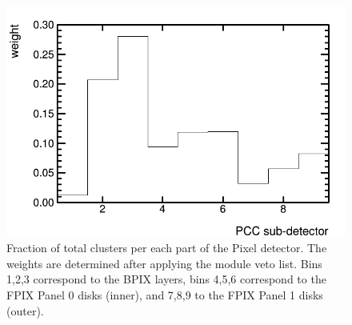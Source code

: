 \newpage
\begin{figure}[hc]
  \begin{center}
    \includegraphics[width=0.7\linewidth]{plots/PCCWeights.png}
    \caption{
      Fraction of total clusters per each part of the Pixel detector. The weights are determined after applying the module veto list.
      Bins 1,2,3 correspond to the BPIX layers, bins 4,5,6 correspond to the FPIX Panel 0 disks (inner), and 7,8,9 to the FPIX Panel 1 disks (outer).
      \label{fig:pixelweights}
    }
  \end{center}
\end{figure}




